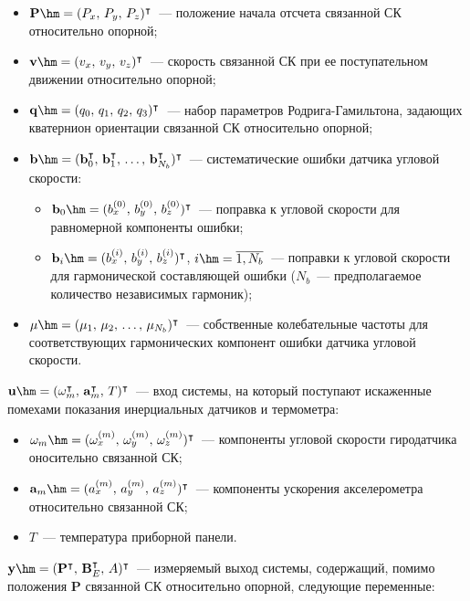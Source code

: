 \documentclass[
  AUTHOR={Симаков, В.А.},
  TITLE={Управление ориентацией беспилотных систем},
  SUBJECT={Проблемы навигации летательных аппаратов},
  SOURCE={./\jobname.zip},
  12pt,oneside]{commart}
\begin{document}
\begin{itemize}
\item $\mathbf{P}\hm=(P_x,\,P_y,\,P_z)^\intercal$~--- положение начала отсчета связанной СК относительно опорной;
\item $\mathbf{v}\hm=(v_x,\,v_y,\,v_z)^\intercal$~--- скорость связанной СК при ее поступательном движении относительно опорной;
\item $\mathbf{q}\hm=(q_0,\,q_1,\,q_2,\,q_3)^\intercal$~--- набор параметров Родрига-Гамильтона, задающих кватернион ориентации связанной СК относительно опорной;
\item $\mathbf{b}\hm=(\mathbf{b}_0^{\intercal},\,\mathbf{b}_1^{\intercal},\,\dots,\,\mathbf{b}_{N_b}^{\intercal})^\intercal$~--- систематические ошибки датчика угловой скорости:
\begin{itemize}
\item $\mathbf{b}_0\hm=(b_x^{(0)},\,b_y^{(0)},\,b_z^{(0)})^\intercal$~--- поправка к угловой скорости для равномерной компоненты ошибки;
\item $\mathbf{b}_i\hm=(b_x^{(i)},\,b_y^{(i)},\,b_z^{(i)})^\intercal$, $i\hm=\overline{1,N_b}$~--- поправки к угловой скорости для гармонической составляющей ошибки ($N_b$~--- предполагаемое количество независимых гармоник);
\end{itemize}
\item $\mathbf{\mu}\hm=(\mu_1,\,\mu_2,\,\dots,\,\mu_{N_b})^{\intercal}$~--- собственные колебательные частоты для соответствующих гармонических компонент ошибки датчика угловой скорости.
\end{itemize}

$\mathbf{u}\hm=(\mathbf{\omega}_m^{\intercal},\,\mathbf{a}_m^{\intercal},\,T)^\intercal$~--- вход системы, на который поступают искаженные помехами показания инерциальных датчиков и термометра:

\begin{itemize}
\item $\mathbf{\omega}_m\hm=(\omega_x^{(m)},\,\omega_y^{(m)},\,\omega_z^{(m)})^{\intercal}$~--- компоненты угловой скорости гиродатчика оносительно связанной СК;
\item $\mathbf{a}_m\hm=(a_x^{(m)},\,a_y^{(m)},\,a_z^{(m)})^{\intercal}$~--- компоненты ускорения акселерометра относительно связанной СК;
\item $T$~--- температура приборной панели.
\end{itemize}

$\mathbf{y}\hm=(\mathbf{P}^{\intercal},\,\mathbf{B}_E^{\intercal},\,A)^\intercal$~--- измеряемый выход системы, содержащий, помимо положения $\mathbf{P}$ связанной СК относительно опорной, следующие переменные:
\end{document}
